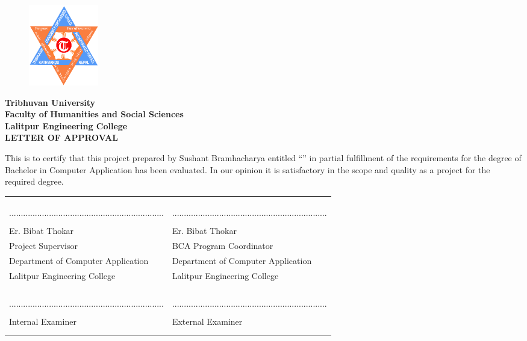 \begin{figure}
    \centering
    \includegraphics[width=1.2in]{img/Graphics/TUlogo.png}
\end{figure}
\begin{center}
    {\fontsize{14pt}{18}\selectfont
    \textbf{Tribhuvan University\\
    Faculty of Humanities and Social Sciences\\
    Lalitpur Engineering College\\
    \vspace{0.2in}
    LETTER OF APPROVAL\\}
    }
\end{center}
This is to certify that this project prepared by Sushant Bramhacharya entitled “\textbf{\thetitle}” in partial fulfillment of the requirements for the degree of Bachelor in Computer Application has been evaluated. In our opinion it is satisfactory in the
scope and quality as a project for the required degree.\\
\begin{center}
    {\fontsize{14pt}{18}\selectfont
    \begin{table}[ht]
        \begin{tabularx}{\textwidth}{|Y|Y|}
        \hline
        &\\
        &\\
        &\\
        ..................................................................&..................................................................\\
        &\\
        Er. Bibat Thokar & Er. Bibat Thokar \\
        Project Supervisor & BCA Program Coordinator \\
        Department of Computer Application & Department of Computer Application\\
        Lalitpur Engineering College & Lalitpur Engineering College \\
        &\\
        \hline
        &\\
        &\\
        &\\
        ..................................................................&..................................................................\\
        &\\
        Internal Examiner&External Examiner  \\
        &\\
        &\\
        \hline
        \end{tabularx}
        \end{table}
    }
\end{center}